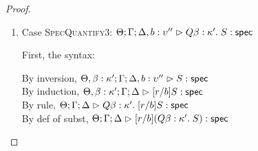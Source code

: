 \begin{proof}
\begin{enumerate}
  For semantics, consider
  $\interp{\judgeS[\Theta; \Gamma; \Delta]
                  {[r/b](Q x:A.\;S)}}\;\theta\;\gamma\;\delta$ 
  \begin{eqnproof}
          {Semantics}
          {Induction}
          {Semantics}
  \end{eqnproof}

\item Case \textsc{SpecQuantify3}: $\judgeS[\Theta; \Gamma; \Delta, b:\upsilon'']{Q \beta:\kappa'.\;S}$
  
  First, the syntax:
  \begin{tabbedproof}
    \oo By inversion, $\judgeS[\Theta, \beta:\kappa'; \Gamma; \Delta, b:\upsilon'']{S}$ \\
    \oo By induction, $\judgeS[\Theta, \beta:\kappa'; \Gamma; \Delta]{[r/b]S}$ \\
    \oo By rule, $\judgeS[\Theta; \Gamma; \Delta]
                         {Q \beta:\kappa'.\;[r/b]S}$ \\
    \oo By def of subst, $\judgeS[\Theta; \Gamma; \Delta]
                                 {[r/b](Q \beta:\kappa'.\;S)}$ 
  \end{tabbedproof}


\end{enumerate}
\end{proof}
